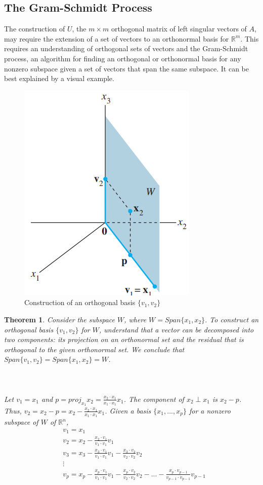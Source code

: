 \documentclass[12pt, reqno]{amsart}
\newtheorem{theorem}{Theorem}[section]
\theoremstyle{definition}
\theoremstyle{remark}
\numberwithin{equation}{section}
\begin{document}
\subsection{The Gram-Schmidt Process}
The construction of $U$, the $m \times m$ orthogonal matrix of left singular vectors of $A$, may require the extension of a set of vectors to an orthonormal basis for $\mathbb{R}^m$. This requires an understanding of orthogonal sets of vectors and the Gram-Schmidt process, an algorithm for finding an orthogonal or orthonormal basis for any nonzero subspace given a set of vectors that span the same subspace. It can be best explained by a visual example.
\begin{figure}[h]
    \centering
    \includegraphics[width=0.3\linewidth]{img/gramschmidt.png}
    \caption{Construction of an orthogonal basis $\{v_1, v_2\}$ \cite{Lay}}
    \label{fig:gramschmidt}
\end{figure}
\begin{theorem}\label{theoGramSchmidt}
    Consider the subspace $W$, where $W = Span \{x_1, x_2\}$. To construct an orthogonal basis $\{v_1, v_2\}$ for $W$, understand that a vector can be decomposed into two components: its projection on an orthonormal set and the residual that is orthogonal to the given orthonormal set. We conclude that $Span\{v_1, v_2\} = Span \{x_1, x_2\} = W$.\\\\
    \noindent {}\\\\
    Let $v_1 = x_1$ and $p = proj_{x_1}x_2 = \frac{x_2 \cdot x_1}{x_1 \cdot x_1}x_1$. The component of $x_2 \perp x_1$ is $x_2 - p$. Thus, $v_2 = x_2 - p = x_2 - \frac{x_2 \cdot x_1}{x_1 \cdot x_1}x_1$. Given a basis $\{x_1,...,x_p\}$ for a nonzero subspace of $W$ of $\mathbb{R}^n$,
    \begin{align}\label{eqGramSchmidt}
        &v_1 = x_1\nonumber\\
        &v_2 = x_2 - \frac{x_2 \cdot v_1}{v_1 \cdot v_1}v_1\nonumber\\
        &v_3 = x_3 - \frac{x_3 \cdot v_1}{v_1 \cdot v_1}v_1 - \frac{x_3 \cdot v_2}{v_2 \cdot v_2}v_2\nonumber\\
        &\vdots\nonumber\\
        &v_p = x_p - \frac{x_p \cdot v_1}{v_1 \cdot v_1}v_1 - \frac{x_p \cdot v_2}{v_2 \cdot v_2}v_2 - ... - \frac{x_p \cdot v_{p-1}}{v_{p-1} \cdot v_{p-1}}v_{p-1}
    \end{align}
\end{theorem}
\end{document}
